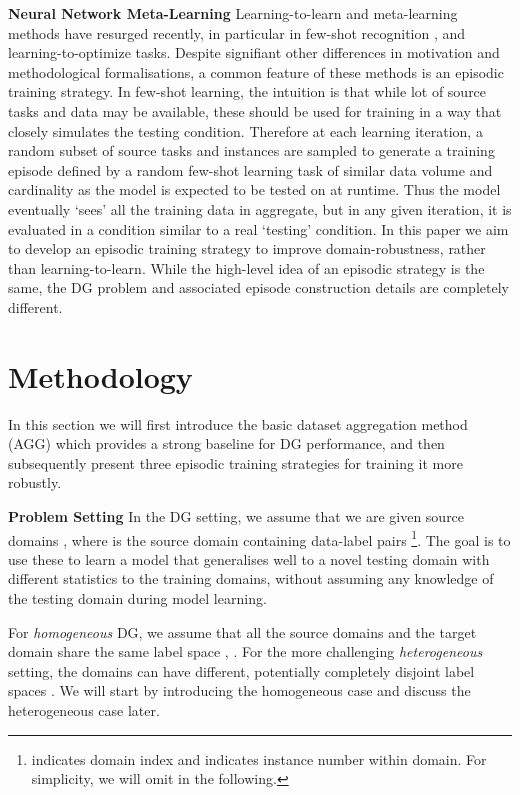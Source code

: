 \documentclass[10pt,twocolumn,letterpaper]{article}
\newcommand{\keypoint}[1]{\vspace{0.1cm}\noindent\textbf{#1}\quad}
\newcommand{\cut}[1]{}
\begin{document}
\keypoint{Neural Network Meta-Learning} Learning-to-learn and meta-learning methods have resurged recently, in particular in few-shot recognition \cite{finn2017model,snell2017prototypicalNets,mishra2017metaTC}, and learning-to-optimize \cite{ravi2016optimization} tasks. Despite signifiant other differences in motivation and methodological formalisations, a common feature of these methods is an episodic training strategy. In few-shot learning, the intuition is that while lot of source tasks and data may be available, these should be used for training in a way that closely simulates the testing condition. Therefore at each learning iteration, a random subset of source tasks and instances are sampled to generate a training episode defined by a random few-shot learning task of similar data volume and cardinality as the model is expected to be tested on at runtime. Thus the model eventually `sees' all the training data in aggregate, but in any given iteration, it is evaluated in a condition similar to a real `testing' condition. In this paper we aim to develop an episodic training strategy to improve domain-robustness, rather than learning-to-learn. While the high-level idea of an episodic strategy is the same, the DG problem and associated episode construction details are completely different. 





\section{Methodology}


In this section we will first introduce the basic dataset aggregation method (AGG)  which provides a strong baseline for DG performance, and then subsequently present three episodic training strategies for training it more robustly.

\keypoint{Problem Setting} In the DG setting, we assume that we are given   source domains , where  is the \cut{()} source domain containing data-label pairs {\footnote{ indicates domain index and  indicates instance number within domain. For simplicity, we will omit  in the following.}}. The goal is to use these to learn a model  that generalises well to a novel testing domain  with different statistics to the training domains, without assuming any knowledge of the testing domain during model learning. 

For \emph{homogeneous} DG, we assume that all the source domains and the target domain share the same label space , . For the more challenging \emph{heterogeneous} setting, the domains can have different, potentially completely disjoint label spaces . We will start by introducing the homogeneous case and discuss the heterogeneous case later.
\end{document}
